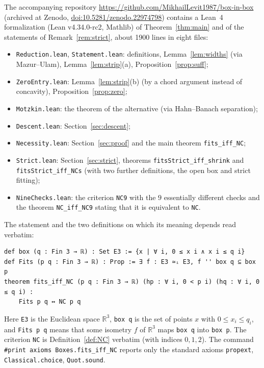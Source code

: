 \documentclass[11pt]{article}
\theoremstyle{definition}
\theoremstyle{remark}
\newcommand{\R}{\mathbb{R}}
\begin{document}
The accompanying repository \url{https://github.com/MikhailLevit1987/box-in-box} (archived at Zenodo, \href{https://doi.org/10.5281/zenodo.22974798}{doi:10.5281/zenodo.22974798}) contains a Lean~4 formalization (Lean v4.34.0-rc2, Mathlib) of
Theorem~\ref{thm:main} and of the statements of Remark~\ref{rem:strict}, about 1900 lines in eight
files:
\begin{itemize}
\item \texttt{Reduction.lean}, \texttt{Statement.lean}: definitions, Lemma~\ref{lem:widths} (via
Mazur--Ulam), Lemma~\ref{lem:strip}(a), Proposition~\ref{prop:suff};
\item \texttt{ZeroEntry.lean}: Lemma~\ref{lem:strip}(b) (by a chord argument instead of concavity),
Proposition~\ref{prop:zero};
\item \texttt{Motzkin.lean}: the theorem of the alternative (via Hahn--Banach separation);
\item \texttt{Descent.lean}: Section~\ref{sec:descent};
\item \texttt{Necessity.lean}: Section~\ref{sec:proof} and the main theorem \texttt{fits\_iff\_NC};
\item \texttt{Strict.lean}: Section~\ref{sec:strict}, theorems \texttt{fitsStrict\_iff\_shrink} and
\texttt{fitsStrict\_iff\_NCs} (with two further definitions, the open box and strict fitting);
\item \texttt{NineChecks.lean}: the criterion \texttt{NC9} with the $9$ essentially different checks and
the theorem \texttt{NC\_iff\_NC9} stating that it is equivalent to \texttt{NC}.
\end{itemize}
The statement and the two definitions on which its meaning depends read verbatim:
\begin{verbatim}
def box (q : Fin 3 → ℝ) : Set E3 := {x | ∀ i, 0 ≤ x i ∧ x i ≤ q i}
def Fits (p q : Fin 3 → ℝ) : Prop := ∃ f : E3 ≃ᵢ E3, f '' box q ⊆ box p
theorem fits_iff_NC (p q : Fin 3 → ℝ) (hp : ∀ i, 0 < p i) (hq : ∀ i, 0 ≤ q i) :
    Fits p q ↔ NC p q
\end{verbatim}
Here \texttt{E3} is the Euclidean space $\R^3$, \texttt{box q} is the set of points $x$ with
$0\le x_i\le q_i$, and \texttt{Fits p q} means that some isometry $f$ of $\R^3$ maps \texttt{box q}
into \texttt{box p}. The criterion \texttt{NC} is Definition~\ref{def:NC} verbatim (with indices
$0,1,2$). The command \texttt{\#print axioms Boxes.fits\_iff\_NC} reports only the standard axioms
\texttt{propext}, \texttt{Classical.choice}, \texttt{Quot.sound}.
\end{document}
